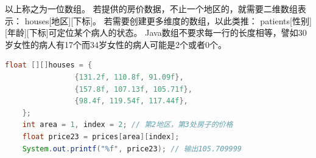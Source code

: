 \bigskip

以上称之为一位数组。
若提供的房价数据，不止一个地区的，就需要二维数组表示：
houses[地区][下标]。
若需要创建更多维度的数组，以此类推：
patients[性别][年龄][下标]可定位某个病人的状态。
Java数组不要求每一行的长度相等，譬如30岁女性的病人有17个而34岁女性的病人可能是2个或者0个。

\begin{lstlisting}[language=java]
	float [][]houses = {
				{131.2f, 110.8f, 91.09f},
				{157.8f, 107.13f, 105.71f},
				{98.4f, 119.54f, 117.44f},
	};
	int area = 1, index = 2; // 第2地区，第3处房子的价格
	float price23 = prices[area][index];
	System.out.printf("%f", price23); // 输出105.709999
\end{lstlisting}

\bigskip

